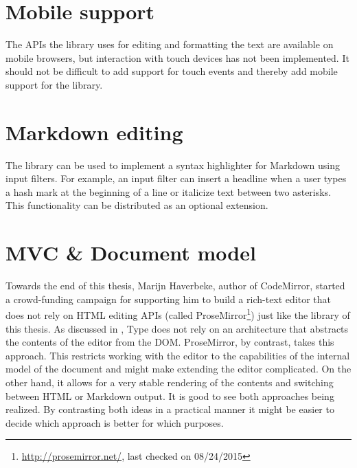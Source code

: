 

\section{Mobile support}

The APIs the library uses for editing and formatting the text are available on mobile browsers, but interaction with touch devices has not been implemented. It should not be difficult to add support for touch events and thereby add mobile support for the library.


\section{Markdown editing}

The library can be used to implement a syntax highlighter for Markdown using input filters. For example, an input filter can insert a headline when a user types a hash mark at the beginning of a line or italicize text between two asterisks. This functionality can be distributed as an optional extension.

\section{MVC \& Document model}

Towards the end of this thesis, Marijn Haverbeke, author of CodeMirror, started a crowd-funding campaign for supporting him to build a rich-text editor that does not rely on HTML editing APIs (called ProseMirror\footnote{\url{http://prosemirror.net/}, last checked on 08/24/2015}) just like the library of this thesis. As discussed in , Type does not rely on an architecture that abstracts the contents of the editor from the DOM. ProseMirror, by contrast, takes this approach. This restricts working with the editor to the capabilities of the internal model of the document and might make extending the editor complicated. On the other hand, it allows for a very stable rendering of the contents and switching between HTML or Markdown output. It is good to see both approaches being realized. By contrasting both ideas in a practical manner it might be easier to decide which approach is better for which purposes.


